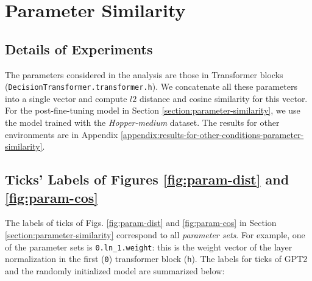 \documentclass{article}
\begin{document}
\section{Parameter Similarity}
\label{appendix:parameter-similarity}

\subsection{Details of Experiments}
\label{appendix:detail-of-experiments-parameter-similarity}
The parameters considered in the analysis are those in Transformer blocks (\lstinline{DecisionTransformer.transformer.h}). We concatenate all these parameters into a single vector and compute $l2$ distance and cosine similarity for this vector. For the post-fine-tuning model in Section \ref{section:parameter-similarity}, we use the model trained with the \textit{Hopper-medium} dataset. The results for other environments are in Appendix \ref{appendix:results-for-other-conditions-parameter-similarity}. 

\subsection{Ticks' Labels of Figures \ref{fig:param-dist} and \ref{fig:param-cos}}
\label{appendix:parameter-name}
The labels of ticks of Figs. \ref{fig:param-dist} and \ref{fig:param-cos} in Section \ref{section:parameter-similarity} correspond to all \textit{parameter sets}. For example, one of the parameter sets is \lstinline{0.ln_1.weight}: this is the weight vector of the layer normalization in the first (\lstinline{0}) transformer block (\lstinline{h}). The labels for ticks of GPT2 and the randomly initialized model are summarized below:
\end{document}
